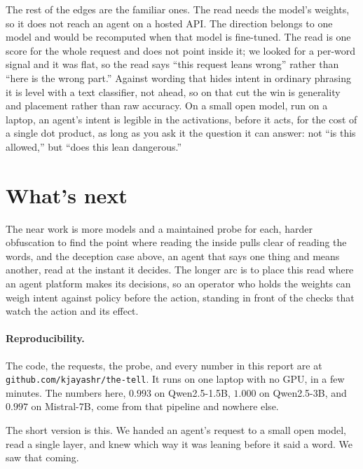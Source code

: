 \documentclass[11pt]{article}
\begin{document}
The rest of the edges are the familiar ones. The read needs the model's weights, so it does not reach
an agent on a hosted API. The direction belongs to one model and would be recomputed when that model
is fine-tuned. The read is one score for the whole request and does not point inside it; we looked for
a per-word signal and it was flat, so the read says ``this request leans wrong'' rather than ``here is
the wrong part.'' Against wording that hides intent in ordinary phrasing it is level with a text
classifier, not ahead, so on that cut the win is generality and placement rather than raw accuracy.
On a small open model, run on a laptop, an agent's intent is
legible in the activations, before it acts, for the cost of a single dot product, as long as you ask
it the question it can answer: not ``is this allowed,'' but ``does this lean dangerous.''

\section{What's next}
The near work is more models and a maintained probe for each, harder obfuscation to find the point
where reading the inside pulls clear of reading the words, and the deception case above, an agent that
says one thing and means another, read at the instant it decides. The longer arc is to place this read
where an agent platform makes its decisions, so an operator who holds the weights can weigh intent
against policy before the action, standing in front of the checks that watch the action and its
effect.

\paragraph{Reproducibility.} The code, the requests, the probe, and every number in this report are
at \texttt{github.com/kjayashr/the-tell}. It runs on one laptop with no GPU, in a few minutes. The
numbers here, $0.993$ on Qwen2.5-1.5B, $1.000$ on Qwen2.5-3B, and $0.997$ on Mistral-7B, come from
that pipeline and nowhere else.

\vspace{0.4em}
The short version is this. We handed an agent's request to a small open model, read a single layer,
and knew which way it was leaning before it said a word. We saw that coming.
\end{document}
